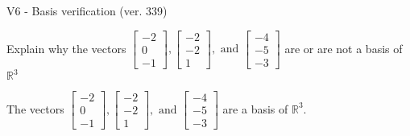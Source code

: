 \begin{exercise}
  \begin{exerciseTitle}V6 - Basis verification (ver. 339)\end{exerciseTitle}
  \begin{exerciseStatement}
    Explain why the vectors \(\left[\begin{array}{r}
-2 \\
0 \\
-1
\end{array}\right] , \left[\begin{array}{r}
-2 \\
-2 \\
1
\end{array}\right] , \text{ and } \left[\begin{array}{r}
-4 \\
-5 \\
-3
\end{array}\right]\) are or are not a basis of \(\mathbb{R}^3\)	


  \end{exerciseStatement}
  \begin{exerciseAnswer}
   The vectors \(\left[\begin{array}{r}
-2 \\
0 \\
-1
\end{array}\right] , \left[\begin{array}{r}
-2 \\
-2 \\
1
\end{array}\right] , \text{ and } \left[\begin{array}{r}
-4 \\
-5 \\
-3
\end{array}\right]\) 
  	 are  a basis of \(\mathbb{R}^3\).
  


  \end{exerciseAnswer}
\end{exercise}